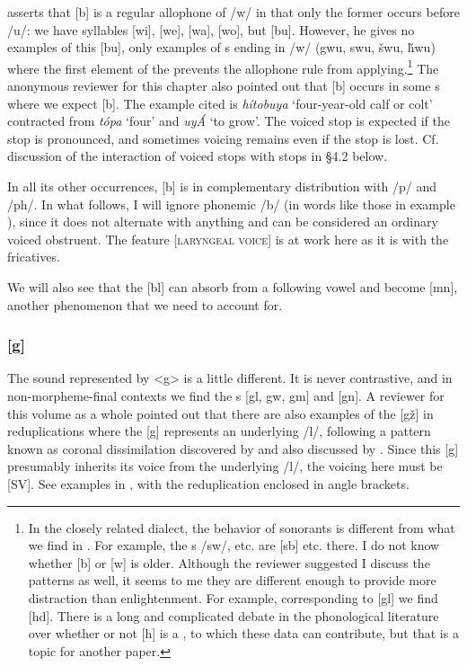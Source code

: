 \documentclass[output=paper]{LSP/langsci}
\begin{document}
\citet[8]{Rankin2001} asserts that [b] is a regular allophone of /w/ in that only the former occurs before /u/: we have syllables [wi], [we], [wa], [wo], but [bu]. However, he gives no examples of this [bu], only examples of s ending in /w/ (gwu, swu, \v{s}wu, \v{h}wu) where the first element of the  prevents the allophone rule from applying.\footnote{In the closely related  dialect, the behavior of sonorants is different from what we find in . For example, the s /sw/, etc. are [sb] etc. there. I do not know whether [b] or [w] is older. Although the reviewer suggested I discuss the  patterns as well, it seems to me they are different enough to provide more distraction than enlightenment. For example, corresponding to  [gl] we find  [hd]. There is a long and complicated debate in the phonological literature over whether or not [h] is a , to which these  data can contribute, but that is a topic for another paper.} The anonymous reviewer for this chapter also pointed out that [b] occurs in some s where we expect [b]. The example cited is \textit{hítobuya} `four-year-old calf or colt' contracted from \textit{t\'opa} `four' and \textit{uyÁ} `to grow'. The voiced stop is expected if the  stop is pronounced, and sometimes voicing remains even if the  stop is lost. Cf. discussion of the interaction of voiced stops with  stops in \S 4.2 below.

In all its other occurrences, [b] is in complementary distribution with /p/ and /ph/. In what follows, I will ignore phonemic /b/ (in words like those in example ), since it does not alternate with anything and can be considered an ordinary voiced obstruent. The feature [\textsc{laryngeal voice}] is at work here as it is with the fricatives.

We will also see that the [bl]  can absorb  from a following vowel and become [mn], another phenomenon that we need to account for.

\subsubsection{[g]} 
\largerpage
The sound represented by <g> is a little different. It is never contrastive, and in non-morpheme-final contexts we find the s [gl, gw, gm] and [gn]. A reviewer for this volume as a whole pointed out that there are also examples of the  [g\v{z}] in reduplications where the [g] represents an underlying /l/, following a pattern known as coronal dissimilation discovered by \citet[225--226]{Carter1974} and also discussed by \citet[338]{Shaw1980}.  Since this [g] presumably inherits its voice from the underlying /l/, the voicing here must be [\textsc{SV}].  See examples in , with the reduplication enclosed in angle brackets.
 
\end{document}
